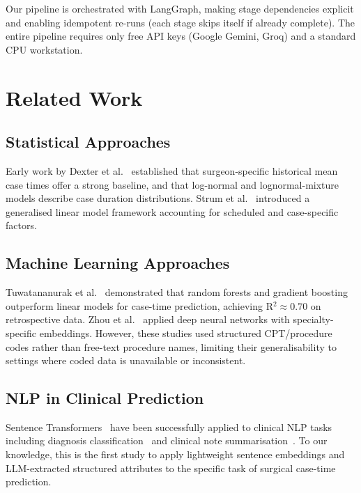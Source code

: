\documentclass[11pt,twocolumn]{article}
\begin{document}
Our pipeline is orchestrated with LangGraph, making stage dependencies explicit
and enabling idempotent re-runs (each stage skips itself if already complete).
The entire pipeline requires only free API keys (Google Gemini, Groq) and a
standard CPU workstation.

\section{Related Work}
\label{sec:related}

\subsection{Statistical Approaches}
Early work by Dexter et al.~\cite{dexter2001, dexter2002} established that
surgeon-specific historical mean case times offer a strong baseline, and that
log-normal and lognormal-mixture models describe case duration distributions.
Strum et al.~\cite{strum2000} introduced a generalised linear model framework
accounting for scheduled and case-specific factors.

\subsection{Machine Learning Approaches}
Tuwatananurak et al.~\cite{tuwatananurak2019} demonstrated that random forests and
gradient boosting outperform linear models for case-time prediction, achieving
R$^2 \approx 0.70$ on retrospective data.  Zhou et al.~\cite{zhou2021} applied
deep neural networks with specialty-specific embeddings.  However, these studies
used structured CPT/procedure codes rather than free-text procedure names, limiting
their generalisability to settings where coded data is unavailable or inconsistent.

\subsection{NLP in Clinical Prediction}
Sentence Transformers~\cite{reimers2019} have been successfully applied to
clinical NLP tasks including diagnosis classification~\cite{huang2020} and clinical
note summarisation~\cite{moen2016}.  To our knowledge, this is the first study to
apply lightweight sentence embeddings and LLM-extracted structured attributes to
the specific task of surgical case-time prediction.

\end{document}

